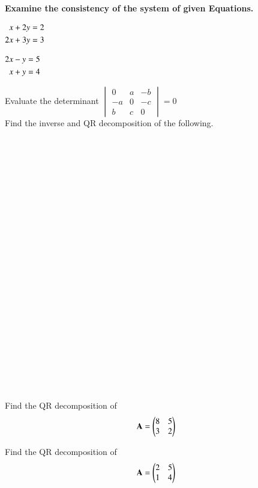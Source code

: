 \textbf{Examine the consistency of the system of given Equations.}
\item 
$\begin{alignedat}[t]{2}
x+2y&=2 
\\
2x+3y&=3 
\end{alignedat}$
\item $\begin{alignedat}[t]{2}
2x-y&=5 
\\
x+y&=4 
\end{alignedat}$
\item Evaluate the determinant
$\begin{vmatrix}0&a&-b\\-a&0&-c\\b&c&0\end{vmatrix}=0$
\\
Find the inverse and QR decomposition of the following.
  \item {}\\
  \item{}\\
  \item{}\\
  \item{}\\
  \item {}\\
  \item {}\\
  \item {}\\
  \item {}\\
  \item {}\\
  \item {}\\
  \item {}\\
  \item {}\\
  \item {}\\
\item Find the QR decomposition of 
\begin{align}
\mathbf{A}=\begin{pmatrix}8&5\\3&2\end{pmatrix} \label{eq:solutions/decomp/2/29/eq:1}
\end{align}
%
\item Find the QR decomposition of 
\begin{align}
\mathbf{A}=\begin{pmatrix}2&5\\1&4\end{pmatrix} \label{eq:solutions/decomp/2/30/1}
\end{align}

%        

